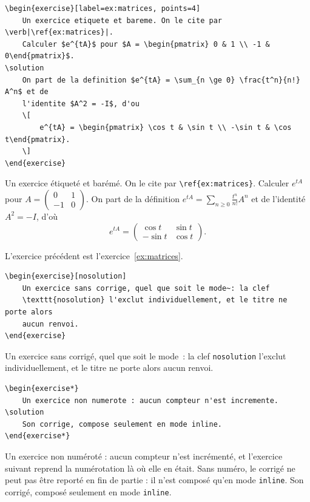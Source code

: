\begin{lstlisting}
\begin{exercise}[label=ex:matrices, points=4]
    Un exercice etiquete et bareme. On le cite par \verb|\ref{ex:matrices}|.
    Calculer $e^{tA}$ pour $A = \begin{pmatrix} 0 & 1 \\ -1 & 0\end{pmatrix}$.
\solution
    On part de la definition $e^{tA} = \sum_{n \ge 0} \frac{t^n}{n!} A^n$ et de
    l'identite $A^2 = -I$, d'ou
    \[
        e^{tA} = \begin{pmatrix} \cos t & \sin t \\ -\sin t & \cos t\end{pmatrix}.
    \]
\end{exercise}
\end{lstlisting}
\begin{exercise}[label=ex:matrices, points=4]
    Un exercice étiqueté et barémé. On le cite par \verb|\ref{ex:matrices}|.
    Calculer $e^{tA}$ pour $A = \begin{pmatrix} 0 & 1 \\ -1 & 0\end{pmatrix}$.
\solution
    On part de la définition $e^{tA} = \sum_{n \ge 0} \frac{t^n}{n!} A^n$ et de
    l'identité $A^2 = -I$, d'où
    \[
        e^{tA} = \begin{pmatrix} \cos t & \sin t \\ -\sin t & \cos t\end{pmatrix}.
    \]
\end{exercise}

L'exercice précédent est l'exercice~\ref{ex:matrices}.

\begin{lstlisting}
\begin{exercise}[nosolution]
    Un exercice sans corrige, quel que soit le mode~: la clef
    \texttt{nosolution} l'exclut individuellement, et le titre ne porte alors
    aucun renvoi.
\end{exercise}
\end{lstlisting}
\begin{exercise}[nosolution]
    Un exercice sans corrigé, quel que soit le mode~: la clef
    \texttt{nosolution} l'exclut individuellement, et le titre ne porte alors
    aucun renvoi.
\end{exercise}

\begin{lstlisting}
\begin{exercise*}
    Un exercice non numerote : aucun compteur n'est incremente.
\solution
    Son corrige, compose seulement en mode inline.
\end{exercise*}
\end{lstlisting}
\begin{exercise*}
    Un exercice non numéroté : aucun compteur n'est incrémenté, et l'exercice
    suivant reprend la numérotation là où elle en était. Sans numéro, le
    corrigé ne peut pas être reporté en fin de partie : il n'est composé qu'en
    mode \texttt{inline}.
\solution
    Son corrigé, composé seulement en mode \texttt{inline}.
\end{exercise*}

